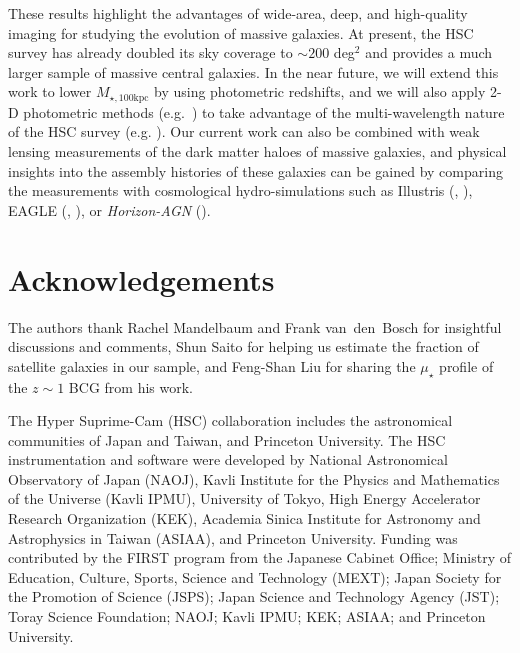 \documentclass[fleqn,usenatbib]{mnras}
\def\mtot{{$M_{\star,100\mathrm{kpc}}$}}
\def\mden{{$\mu_{\star}$}}
\begin{document}
    These results highlight the advantages of wide-area, deep, and high-quality imaging 
    for studying the evolution of massive galaxies. 
    At present, the HSC survey has already doubled its sky coverage to 
    ${\sim} 200$ deg$^2$ and provides a much larger sample of massive central galaxies. 
    In the near future, we will extend this work to lower \mtot{} by using photometric 
    redshifts, and we will also apply 2-D photometric methods 
    (e.g.\ \citealt{Huang2013a}) to take advantage of the multi-wavelength nature of 
    the HSC survey (e.g. \citealt{Huang2016}). 
    Our current work can also be combined with weak lensing measurements of the dark 
    matter haloes of massive galaxies, and physical insights into the assembly histories 
    of these galaxies can be gained by comparing the measurements with cosmological 
    hydro-simulations such as Illustris (\citealt{Vogelsberger2014}, 
    \citealt{Genel2014}), EAGLE (\citealt{Schaye2015}, \citealt{Crain2015}), 
    or \textit{Horizon-AGN} (\citealt{Dubois2014}).

  
\section*{Acknowledgements}

  The authors thank Rachel Mandelbaum and Frank van~den~Bosch for insightful 
  discussions and comments,
  Shun Saito for helping us estimate the fraction of satellite 
  galaxies in our sample, and
  Feng-Shan Liu for sharing the \mden{} profile of the $z\sim1$ BCG from 
  his work.

  The Hyper Suprime-Cam (HSC) collaboration includes the astronomical communities of 
  Japan and Taiwan, and Princeton University.  The HSC instrumentation and software 
  were developed by  National Astronomical Observatory of Japan (NAOJ), Kavli 
  Institute for the Physics and Mathematics of the Universe (Kavli IPMU), University 
  of Tokyo, High Energy Accelerator Research Organization (KEK), Academia Sinica 
  Institute for Astronomy and Astrophysics in Taiwan (ASIAA), and Princeton 
  University.  
  Funding was contributed by the FIRST program from the Japanese Cabinet Office;  
  Ministry of Education, Culture, Sports, Science and Technology (MEXT);  
  Japan Society for the Promotion of Science (JSPS); 
  Japan Science and Technology Agency (JST); 
  Toray Science Foundation; NAOJ; Kavli IPMU; KEK; ASIAA; and Princeton University. 
   
\end{document}
